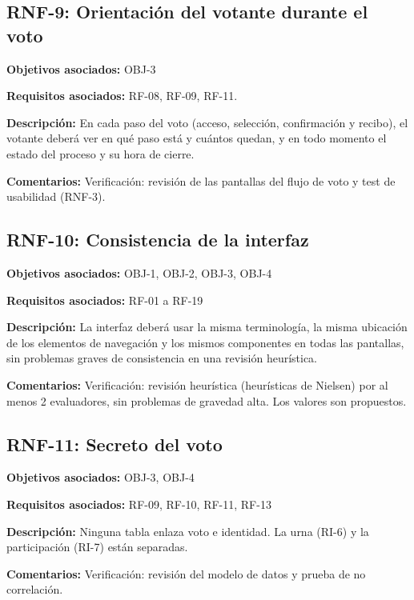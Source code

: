 \subsection{RNF-9: Orientación del votante durante el voto}

\textbf{Objetivos asociados:} OBJ-3\par
\textbf{Requisitos asociados:} RF-08, RF-09, RF-11.\par
\textbf{Descripción:} En cada paso del voto (acceso, selección, confirmación y recibo), el votante deberá ver en qué paso está y cuántos quedan, y en todo momento el estado del proceso y su hora de cierre.\par
\textbf{Comentarios:} Verificación: revisión de las pantallas del flujo de voto y test de usabilidad (RNF-3).\par

\subsection{RNF-10: Consistencia de la interfaz}

\textbf{Objetivos asociados:} OBJ-1, OBJ-2, OBJ-3, OBJ-4\par
\textbf{Requisitos asociados:} RF-01 a RF-19\par
\textbf{Descripción:} La interfaz deberá usar la misma terminología, la misma ubicación de los elementos de navegación y los mismos componentes en todas las pantallas, sin problemas graves de consistencia en una revisión heurística.\par
\textbf{Comentarios:} Verificación: revisión heurística (heurísticas de Nielsen) por al menos 2 evaluadores, sin problemas de gravedad alta. Los valores son propuestos.\par

\subsection{RNF-11: Secreto del voto}

\textbf{Objetivos asociados:} OBJ-3, OBJ-4\par
\textbf{Requisitos asociados:} RF-09, RF-10, RF-11, RF-13\par
\textbf{Descripción:} Ninguna tabla enlaza voto e identidad. La urna (RI-6) y la participación (RI-7) están separadas.\par
\textbf{Comentarios:} Verificación: revisión del modelo de datos y prueba de no correlación.\par

